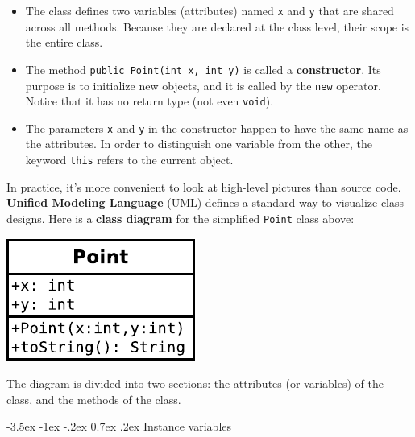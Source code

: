 \documentclass[12pt]{book}
\makeatletter
\theoremstyle{exercise}
\newcommand{\java}[1]{\verb"#1"}
\renewcommand{\section}{\@startsection {section}{1}{\z@}%
    {-3.5ex \@plus -1ex \@minus -.2ex}%
    {0.7ex \@plus.2ex}%
    {\normalfont\Large\bfseries}}
\newcommand{\java}[1]{\lstinline{#1}} %
\makeatother
\begin{document}
\begin{itemize}

\item The class defines two variables (attributes) named \java{x} and \java{y} that are shared across all methods.
Because they are declared at the class level, their scope is the entire class.

\item The method \java{public Point(int x, int y)} is called a {\bf constructor}.
Its purpose is to initialize new objects, and it is called by the \java{new} operator.
Notice that it has no return type (not even \java{void}).

\item The parameters \java{x} and \java{y} in the constructor happen to have the same name as the attributes.
In order to distinguish one variable from the other, the keyword \java{this} refers to the current object.


\end{itemize}

In practice, it's more convenient to look at high-level pictures than source code.
{\bf Unified Modeling Language} (UML) defines a standard way to visualize class designs.
Here is a {\bf class diagram} for the simplified \java{Point} class above:

\begin{center}
\vspace{1ex}
\includegraphics{figs/point.pdf}
\vspace{1ex}
\end{center}

The diagram is divided into two sections: the attributes (or variables) of the class, and the methods of the class.


\section{Instance variables}
\end{document}
